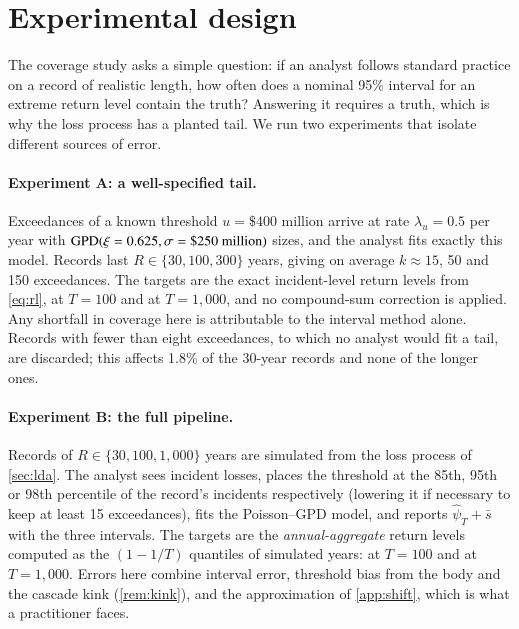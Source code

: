 \section{Experimental design}\label{sec:design}

The coverage study asks a simple question: if an analyst follows standard practice on a record of realistic length, how often does a nominal 95\% interval for an extreme return level contain the truth? Answering it requires a truth, which is why the loss process has a planted tail. We run two experiments that isolate different sources of error.

\paragraph{Experiment A: a well-specified tail.} Exceedances of a known threshold $u = \$400$ million arrive at rate $\lambda_u = 0.5$ per year with $\mathrm{GPD}(\xi = 0.625, \sigma = \$250\text{ million})$ sizes, and the analyst fits exactly this model. Records last $R \in \{30, 100, 300\}$ years, giving on average $k \approx 15$, 50 and 150 exceedances. The targets are the exact incident-level return levels from \cref{eq:rl}, \truthAC{} at $T = 100$ and \truthAK{} at $T=1{,}000$, and no compound-sum correction is applied. Any shortfall in coverage here is attributable to the interval method alone. Records with fewer than eight exceedances, to which no analyst would fit a tail, are discarded; this affects 1.8\% of the 30-year records and none of the longer ones.

\paragraph{Experiment B: the full pipeline.} Records of $R \in \{30, 100, 1{,}000\}$ years are simulated from the loss process of \cref{sec:lda}. The analyst sees incident losses, places the threshold at the 85th, 95th or 98th percentile of the record's incidents respectively (lowering it if necessary to keep at least 15 exceedances), fits the Poisson--GPD model, and reports $\hat\psi_T + \bar s$ with the three intervals. The targets are the \emph{annual-aggregate} return levels computed as the $(1-1/T)$ quantiles of \TruthYears{} simulated years: \truthC{} at $T=100$ and \truthK{} at $T = 1{,}000$. Errors here combine interval error, threshold bias from the body and the cascade kink (\cref{rem:kink}), and the approximation of \cref{app:shift}, which is what a practitioner faces.

